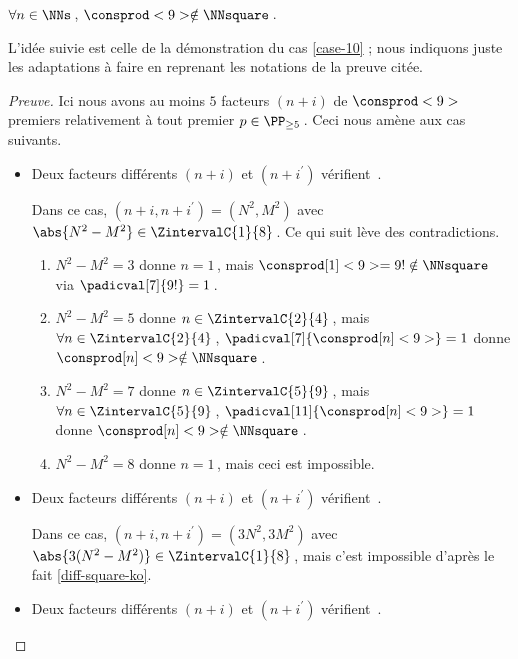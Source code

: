 \begin{fact} \label{case-9}
	 $\forall n \in \NNs$\,, $\consprod<9> \notin \NNsquare$\,.
\end{fact}




L'idée suivie est celle de la démonstration du cas \ref{case-10} ; nous indiquons juste les adaptations à faire en reprenant les notations de la preuve citée.


\begin{proof}[Preuve]%
    Ici nous avons au moins $5$ facteurs $(n + i)$ de $\consprod<9>$ premiers relativement à tout premier $p \in \PP_{\geq 5}$\,. Ceci nous amène aux cas suivants.
    \begin{itemize}
    	\medskip
		\item Deux facteurs différents $(n+i)$ et $(n+i^\prime)$ vérifient \,.
		
		\smallskip
		\noindent
		Dans ce cas, $(n+i, n+i^\prime) = (N^2, M^2)$ avec $\abs{N^2 - M^2} \in \ZintervalC{1}{8}$\,. Ce qui suit lève des contradictions.
		\begin{enumerate}
			\item $N^2 - M^2 = 3$ donne $n = 1$\,, mais $\consprod[1]<9> = 9 ! \notin \NNsquare$ via $\padicval[7]{9!} = 1$\,.


			\item $N^2 - M^2 = 5$ donne $n \in \ZintervalC{2}{4}$\,, mais $\forall n \in \ZintervalC{2}{4}$\,, $\padicval[7]{\consprod[n]<9>} = 1$ donne $\consprod[n]<9> \notin \NNsquare$\,.
			

			\item $N^2 - M^2 = 7$ donne $n \in \ZintervalC{5}{9}$\,, mais $\forall n \in \ZintervalC{5}{9}$\,, $\padicval[11]{\consprod[n]<9>} = 1$ donne $\consprod[n]<9> \notin \NNsquare$\,.


			\item $N^2 - M^2 = 8$ donne $n = 1$\,, mais ceci est impossible.
		\end{enumerate}


    	\medskip
		\item Deux facteurs différents $(n+i)$ et $(n+i^\prime)$ vérifient \,.
		
		\smallskip
		\noindent
		Dans ce cas, $(n+i, n+i^\prime) = (3 N^2, 3 M^2)$ avec $\abs{3(N^2 - M^2)} \in \ZintervalC{1}{8}$\,, mais c'est impossible d'après le fait \ref{diff-square-ko}.

    	\medskip
		\item Deux facteurs différents $(n+i)$ et $(n+i^\prime)$ vérifient \,.
		

\end{itemize}
\end{proof}
